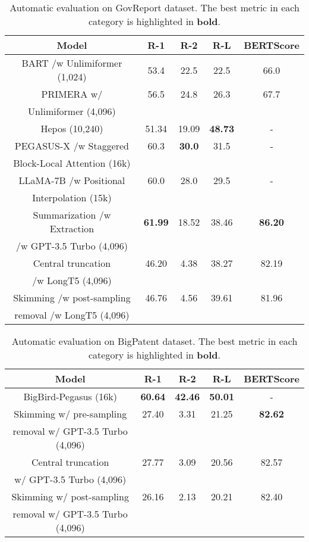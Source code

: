 \documentclass[letterpaper]{article} %
\begin{document}
\begin{table}[!ht]
  \centering
  \scriptsize

  \begin{tabular}{c c c c c}
    \hline
    Model & R-1 & R-2 & R-L & BERTScore \\
    \hline
    BART /w Unlimiformer (1,024) & 53.4 & 22.5 & 22.5 & 66.0 \\
    PRIMERA w/ & 56.5 & 24.8 & 26.3 & 67.7 \\
    Unlimiformer (4,096) & & & & \\
    Hepos (10,240) & 51.34 & 19.09 & \textbf{48.73} & - \\
    PEGASUS-X /w Staggered & 60.3 & \textbf{30.0} & 31.5 & - \\
    Block-Local Attention (16k) & & & & \\
    LLaMA-7B /w Positional & 60.0 & 28.0 & 29.5 & - \\
    Interpolation (15k) & & & & \\
    \hline
    Summarization /w Extraction & \textbf{61.99} & 18.52 & 38.46 & \textbf{86.20} \\
    /w GPT-3.5 Turbo (4,096) & & & & \\
    Central truncation & 46.20 & 4.38 & 38.27 & 82.19 \\
    /w LongT5 (4,096) & & & & \\
    Skimming /w post-sampling & 46.76 & 4.56 & 39.61 & 81.96 \\
    removal /w LongT5 (4,096) & & & & \\
    \hline
  \end{tabular}

  \caption{
    Automatic evaluation on GovReport dataset.
    The best metric in each category is highlighted in \textbf{bold}.
  }
  \label{tab:govreport}
\end{table}

\begin{table}[!t]
  \centering
  \scriptsize

  \begin{tabular}{c c c c c}
    \hline
    Model & R-1 & R-2 & R-L & BERTScore \\
    \hline
    BigBird-Pegasus (16k) & \textbf{60.64} & \textbf{42.46} & \textbf{50.01} & - \\
    \hline
    Skimming w/ pre-sampling & 27.40 & 3.31 & 21.25 & \textbf{82.62} \\
    removal w/ GPT-3.5 Turbo (4,096) & & & & \\
    Central truncation & 27.77 & 3.09 & 20.56 & 82.57 \\
    w/ GPT-3.5 Turbo (4,096) & & & & \\
    Skimming w/ post-sampling & 26.16 & 2.13 & 20.21 & 82.40 \\
    removal w/ GPT-3.5 Turbo (4,096) & & & & \\
    \hline
  \end{tabular}

  \caption{
    Automatic evaluation on BigPatent dataset.
    The best metric in each category is highlighted in \textbf{bold}.
  }
  \label{tab:bigpatent}
\end{table}
\end{document}
